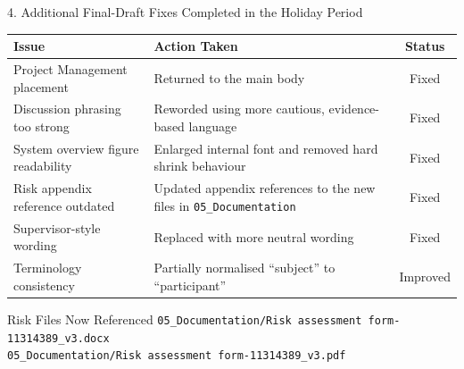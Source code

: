 \documentclass[aspectratio=169, 11pt]{beamer}
\begin{document}
\begin{frame}[shrink=9]{4. Additional Final-Draft Fixes Completed in the Holiday Period}

    \begin{table}
        \centering
        \small
        \begin{tabular}{p{4.1cm}p{5.9cm}c}
            \toprule
            \textbf{Issue} & \textbf{Action Taken} & \textbf{Status} \\
            \midrule
            Project Management placement
            & Returned to the main body
            & \textcolor{completed}{Fixed} \\
            Discussion phrasing too strong
            & Reworded using more cautious, evidence-based language
            & \textcolor{completed}{Fixed} \\
            System overview figure readability
            & Enlarged internal font and removed hard shrink behaviour
            & \textcolor{completed}{Fixed} \\
            Risk appendix reference outdated
            & Updated appendix references to the new files in \texttt{05\_Documentation}
            & \textcolor{completed}{Fixed} \\
            Supervisor-style wording
            & Replaced with more neutral wording
            & \textcolor{completed}{Fixed} \\
            Terminology consistency
            & Partially normalised ``subject'' to ``participant''
            & \textcolor{inprogress}{Improved} \\
            \bottomrule
        \end{tabular}
    \end{table}

    \vspace{2mm}
    \begin{exampleblock}{Risk Files Now Referenced}
        \texttt{05\_Documentation/Risk assessment form-11314389\_v3.docx}\\
        \texttt{05\_Documentation/Risk assessment form-11314389\_v3.pdf}
    \end{exampleblock}
\end{frame}
\end{document}
